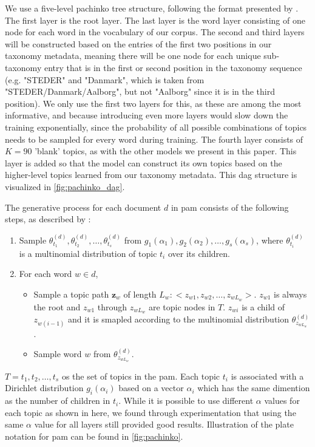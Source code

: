 We use a five-level pachinko tree structure, following the format presented by \citet{li2006pachinko}.
The first layer is the root layer.
The last layer is the word layer consisting of one node for each word in the vocabulary of our corpus.
The second and third layers will be constructed based on the entries of the first two positions in our taxonomy metadata, meaning there will be one node for each unique sub-taxonomy entry that is in the first or second position in the taxonomy sequence (e.g. "STEDER" and "Danmark", which is taken from "STEDER/Danmark/Aalborg", but not "Aalborg" since it is in the third position).
We only use the first two layers for this, as these are among the most informative, and because introducing even more layers would slow down the training exponentially, since the probability of all possible combinations of topics needs to be sampled for every word during training.
The fourth layer consists of $K = 90$ 'blank' topics, as with the other models we present in this paper.
This layer is added so that the model can construct its own topics based on the higher-level topics learned from our taxonomy metadata.
This \gls{dag} structure is visualized in \autoref{fig:pachinko_dag}.

The generative process for each document $d$ in \gls{pam} consists of the following steps, as described by \citet{li2006pachinko}:
\begin{enumerate}
	\item Sample $\theta_{t_1}^{(d)}, \theta_{t_2}^{(d)}, \dots, \theta_{t_s}^{(d)}$ from $g_1(\alpha_1), g_2(\alpha_2), \dots, g_s(\alpha_s)$, where $\theta_{t_i}^{(d)}$ is a multinomial distribution of topic $t_i$ over its children.
	\item For each word $w \in d$,
	\begin{itemize}
		\item Sample a topic path $\mathbf{z}_w$ of length $L_w: < z_{w1}, z_{w2}, \dots, z_{wL_w} >$. $z_{w1}$ is always the root and $z_{w1}$ through $z_{wL_w}$ are topic nodes in $T$. $z_{wi}$ is a child of $z_{w(i-1)}$ and it is smapled according to the multinomial distribution $\theta_{z_{wL_w}}^{(d)}$.
		\item Sample word $w$ from $\theta_{z_{wL_w}}^{(d)}$.
	\end{itemize}
\end{enumerate}
$T = {t_1, t_2, \dots, t_s}$ os the set of topics in the \gls{pam}. 
Each topic $t_i$ is associated with a Dirichlet distribution $g_i(\alpha_i)$ based on a vector $\alpha_i$ which has the same dimention as the number of children in $t_i$.
While it is possible to use different $\alpha$ values for each topic as shown in here, we found through experimentation that using the same $\alpha$ value for all layers still provided good results.
Illustration of the plate notation for \gls{pam} can be found in \autoref{fig:pachinko}.

